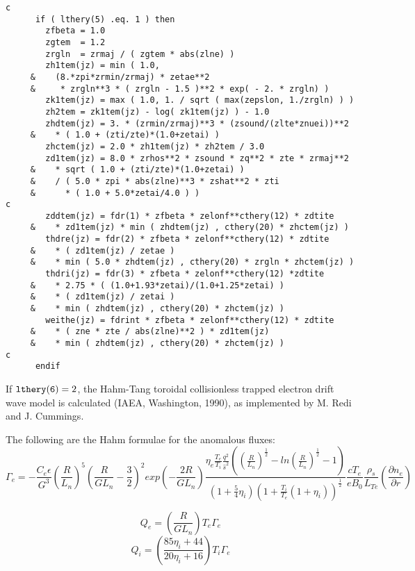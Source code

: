 \begin{verbatim}
c
      if ( lthery(5) .eq. 1 ) then
        zfbeta = 1.0
        zgtem  = 1.2
        zrgln  = zrmaj / ( zgtem * abs(zlne) )
        zh1tem(jz) = min ( 1.0,
     &    (8.*zpi*zrmin/zrmaj) * zetae**2 
     &     * zrgln**3 * ( zrgln - 1.5 )**2 * exp( - 2. * zrgln) )
        zk1tem(jz) = max ( 1.0, 1. / sqrt ( max(zepslon, 1./zrgln) ) )
        zh2tem = zk1tem(jz) - log( zk1tem(jz) ) - 1.0
        zhdtem(jz) = 3. * (zrmin/zrmaj)**3 * (zsound/(zlte*znuei))**2
     &    * ( 1.0 + (zti/zte)*(1.0+zetai) )
        zhctem(jz) = 2.0 * zh1tem(jz) * zh2tem / 3.0
        zd1tem(jz) = 8.0 * zrhos**2 * zsound * zq**2 * zte * zrmaj**2
     &    * sqrt ( 1.0 + (zti/zte)*(1.0+zetai) )
     &    / ( 5.0 * zpi * abs(zlne)**3 * zshat**2 * zti 
     &      * ( 1.0 + 5.0*zetai/4.0 ) )
c
        zddtem(jz) = fdr(1) * zfbeta * zelonf**cthery(12) * zdtite
     &    * zd1tem(jz) * min ( zhdtem(jz) , cthery(20) * zhctem(jz) )
        thdre(jz) = fdr(2) * zfbeta * zelonf**cthery(12) * zdtite
     &    * ( zd1tem(jz) / zetae )
     &    * min ( 5.0 * zhdtem(jz) , cthery(20) * zrgln * zhctem(jz) )
        thdri(jz) = fdr(3) * zfbeta * zelonf**cthery(12) *zdtite
     &    * 2.75 * ( (1.0+1.93*zetai)/(1.0+1.25*zetai) )
     &    * ( zd1tem(jz) / zetai )
     &    * min ( zhdtem(jz) , cthery(20) * zhctem(jz) )
        weithe(jz) = fdrint * zfbeta * zelonf**cthery(12) * zdtite
     &    * ( zne * zte / abs(zlne)**2 ) * zd1tem(jz)
     &    * min ( zhdtem(jz) , cthery(20) * zhctem(jz) )
c
      endif
\end{verbatim}

If $ {\tt lthery(6)} = 2 $, the Hahm-Tang toroidal collisionless trapped
electron drift wave model is calculated (IAEA, Washington, 1990),
as implemented by M. Redi and J. Cummings.

The following are the Hahm formulae for the anomalous fluxes:
\[
\Gamma_e = - \frac{C_{e}\epsilon}{G^{3}}
\left(\frac{R}{L_{n}}\right)^5
\left(\frac{R}{GL_{n}}-\frac{3}{2}\right)^{2}
exp\left(-\frac{2R}{GL_{n}}\right)
\frac{\eta_{e}\frac{T_{e}}{T_{i}}
\frac{q^{2}}{\hat{s}^{2}}((\frac{R}{L_{n}})^{\frac{1}{2}} -
ln(\frac{R}{L_{n}})^{\frac{1}{2}} - 1)}
{(1 + \frac{5}{4}\eta_{i})(1 + \frac{T_{i}}{T_{e}}(1 +
\eta_{i}))^{\frac{1}{2}} }
\frac{cT_{e}}{eB_{0}}
\frac{\rho_{s}}{L_{Te}}
\left(\frac{\partial n_{e}}{\partial r}\right)
\]

\[
Q_{e} = \left(\frac{R}{GL_{n}}\right)T_{e}\Gamma_{e}
\]
\[
Q_{i} = \left(\frac{85 \eta_{i} + 44}{20 \eta_{i} + 16}\right) T_{i}\Gamma_{e}
\]

